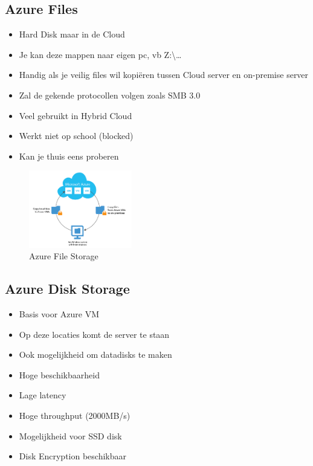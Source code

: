 \documentclass{article}
\begin{document}
\subsection{Azure Files}

\begin{itemize}
    \item  Hard Disk maar in de Cloud
    \item  Je kan deze mappen naar eigen pc, vb Z:\textbackslash\dots
    \item  Handig als je veilig files wil kopiëren tussen Cloud server en on-premise server
    \item  Zal de gekende protocollen volgen zoals SMB 3.0
    \item  Veel gebruikt in Hybrid Cloud
    \item  Werkt niet op school (blocked)
    \item  Kan je thuis eens proberen
\end{itemize}

\begin{figure}[H]
    \centering
    \includegraphics[width=0.4\textwidth]{azure-storage-files.png}
    \caption{Azure File Storage}
\end{figure}


\subsection{Azure Disk Storage}

\begin{itemize}
    \item Basis voor Azure VM
    \item Op deze locaties komt de server te staan
    \item Ook mogelijkheid om datadisks te maken
    \item Hoge beschikbaarheid
    \item Lage latency
    \item Hoge throughput (2000MB/s)
    \item Mogelijkheid voor SSD disk
    \item Disk Encryption beschikbaar
\end{itemize}
\end{document}

